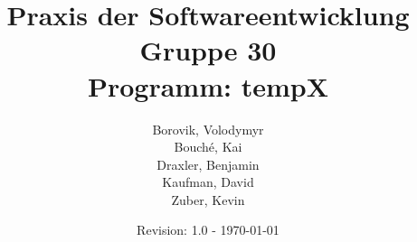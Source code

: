 \begin{titlepage} 						%
\title{Praxis der Softwareentwicklung \\ Gruppe 30 \\ Programm: \textbf{\gls{tempX}}}
\author{
Borovik, Volodymyr \\
Bouché, Kai \\
Draxler, Benjamin \\
Kaufman, David \\
Zuber, Kevin 
}
\date{Revision: 1.0 - \today}
\maketitle
\end{titlepage}							%